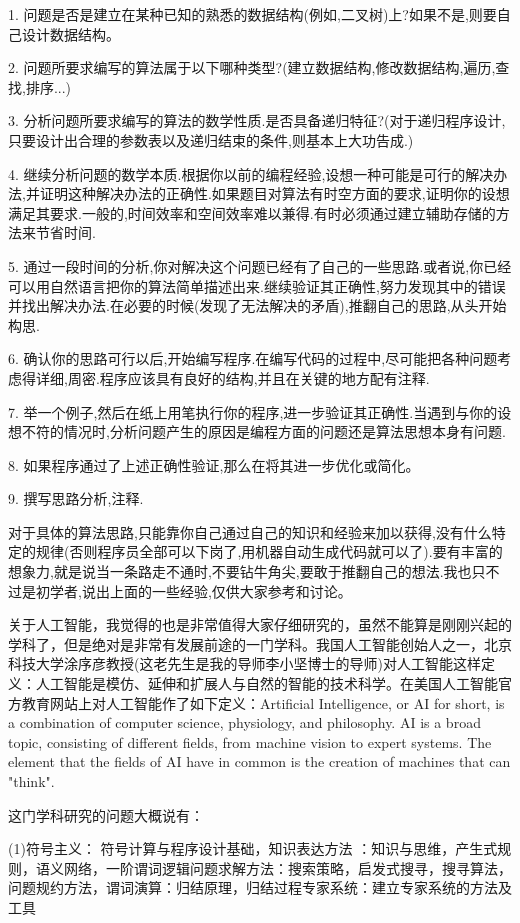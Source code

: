 1. 问题是否是建立在某种已知的熟悉的数据结构(例如,二叉树)上?如果不是,则要自己设计数据结构。 

2. 问题所要求编写的算法属于以下哪种类型?(建立数据结构,修改数据结构,遍历,查找,排序...) 

3. 分析问题所要求编写的算法的数学性质.是否具备递归特征?(对于递归程序设计,只要设计出合理的参数表以及递归结束的条件,则基本上大功告成.) 

4. 继续分析问题的数学本质.根据你以前的编程经验,设想一种可能是可行的解决办法,并证明这种解决办法的正确性.如果题目对算法有时空方面的要求,证明你的设想满足其要求.一般的,时间效率和空间效率难以兼得.有时必须通过建立辅助存储的方法来节省时间. 

5. 通过一段时间的分析,你对解决这个问题已经有了自己的一些思路.或者说,你已经可以用自然语言把你的算法简单描述出来.继续验证其正确性,努力发现其中的错误并找出解决办法.在必要的时候(发现了无法解决的矛盾),推翻自己的思路,从头开始构思. 

6. 确认你的思路可行以后,开始编写程序.在编写代码的过程中,尽可能把各种问题考虑得详细,周密.程序应该具有良好的结构,并且在关键的地方配有注释. 

7. 举一个例子,然后在纸上用笔执行你的程序,进一步验证其正确性.当遇到与你的设想不符的情况时,分析问题产生的原因是编程方面的问题还是算法思想本身有问题. 

8. 如果程序通过了上述正确性验证,那么在将其进一步优化或简化。 

9. 撰写思路分析,注释. 

对于具体的算法思路,只能靠你自己通过自己的知识和经验来加以获得,没有什么特定的规律(否则程序员全部可以下岗了,用机器自动生成代码就可以了).要有丰富的想象力,就是说当一条路走不通时,不要钻牛角尖,要敢于推翻自己的想法.我也只不过是初学者,说出上面的一些经验,仅供大家参考和讨论。 

关于人工智能，我觉得的也是非常值得大家仔细研究的，虽然不能算是刚刚兴起的学科了，但是绝对是非常有发展前途的一门学科。我国人工智能创始人之一，北京科技大学涂序彦教授(这老先生是我的导师李小坚博士的导师)对人工智能这样定义：人工智能是模仿、延伸和扩展人与自然的智能的技术科学。在美国人工智能官方教育网站上对人工智能作了如下定义：Artificial Intelligence, or AI for short, is a combination of computer science, physiology, and philosophy. AI is a broad topic, consisting of different fields, from machine vision to expert systems. The element that the fields of AI have in common is the creation of machines that can "think". 

这门学科研究的问题大概说有： 

(1)符号主义： 符号计算与程序设计基础，知识表达方法 ：知识与思维，产生式规则，语义网络，一阶谓词逻辑问题求解方法：搜索策略，启发式搜寻，搜寻算法，问题规约方法，谓词演算：归结原理，归结过程专家系统：建立专家系统的方法及工具 

